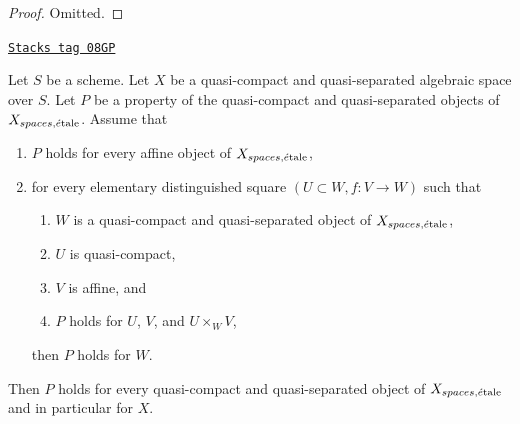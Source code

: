 \begin{proof}
Omitted.
\end{proof}

\begin{lemma}
\label{spaces-perfect-lemma-induction-principle}
\href{https://stacks.math.columbia.edu/tag/08GP}{\texttt{Stacks tag 08GP}}

Let $S$ be a scheme. Let $X$ be a quasi-compact and quasi-separated
algebraic space over $S$. Let $P$ be a property of the quasi-compact
and quasi-separated objects of $X_{spaces, \acute{e}\text{tale}}$. Assume that
\begin{enumerate}
\item $P$ holds for every affine object of $X_{spaces, \acute{e}\text{tale}}$,
\item for every elementary distinguished square $(U \subset W, f : V \to W)$
such that
\begin{enumerate}
\item $W$ is a quasi-compact and quasi-separated object of
$X_{spaces, \acute{e}\text{tale}}$,
\item $U$ is quasi-compact,
\item $V$ is affine, and
\item $P$ holds for $U$, $V$, and $U \times_W V$,
\end{enumerate}
then $P$ holds for $W$.
\end{enumerate}
Then $P$ holds for every quasi-compact and quasi-separated object
of $X_{spaces, \acute{e}\text{tale}}$ and in particular for $X$.
\end{lemma}

